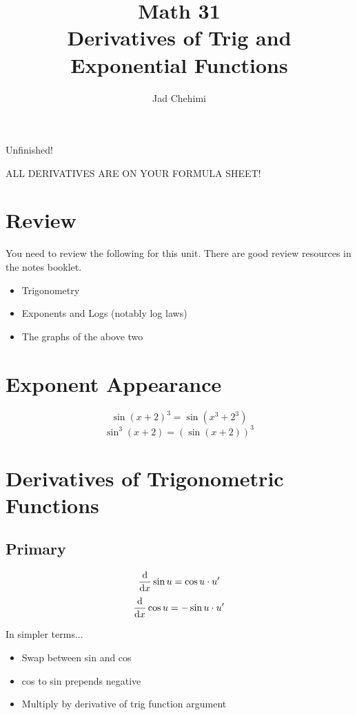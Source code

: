 \documentclass[a4paper,12pt]{article}
\title{Math 31 \\ Derivatives of Trig and Exponential Functions}
\author{Jad Chehimi}
\begin{document}
\maketitle

\begin{center}
\Huge
Unfinished!
\normalsize
\end{center}

\tableofcontents

\pagebreak

\begin{center}
ALL DERIVATIVES ARE ON YOUR FORMULA SHEET!
\end{center}

\section{Review}
You need to review the following for this unit. There are good review resources in the notes booklet.

\begin{itemize}
    \item{Trigonometry}
    \item{Exponents and Logs (notably log laws)}
    \item{The graphs of the above two}
\end{itemize}

\section{Exponent Appearance}
$$\sin{(x + 2)^3} = \sin{(x^3 + 2^3)}$$
$$\sin^3{(x + 2)} = (\sin{(x + 2)})^3$$

\section{Derivatives of Trigonometric Functions}
\subsection{Primary}
$$\dv{}{x} \sin{u} = \cos{u} \cdot u'$$
$$\dv{}{x} \cos{u} = -\sin{u} \cdot u'$$

In simpler terms...
\begin{itemize}
    \item{Swap between sin and cos}
    \item{cos to sin prepends negative}
    \item{Multiply by derivative of trig function argument}
\end{itemize}
\end{document}

